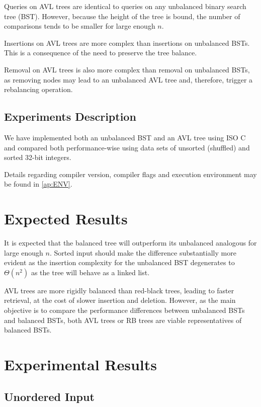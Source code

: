 \documentclass[12pt]{elsarticle}
\begin{document}
Queries on AVL trees are identical to queries on any unbalanced binary search
tree (BST). However, because the height of the tree is bound, the number of
comparisons tends to be smaller for large enough \(n\).

Insertions on AVL trees are more complex than insertions on unbalanced BSTs.
This is a consequence of the need to preserve the tree balance.

Removal on AVL trees is also more complex than removal on unbalanced BSTs, as
removing nodes may lead to an unbalanced AVL tree and, therefore, trigger a
rebalancing operation.

\subsection{Experiments Description}

We have implemented both an unbalanced BST and an AVL tree using ISO C and
compared both performance-wise using data sets of unsorted (shuffled) and sorted
32-bit integers.

Details regarding compiler version, compiler flags and execution environment
may be found in \ref{ap:ENV}.

\section{Expected Results}

It is expected that the balanced tree will outperform its unbalanced analogous
for large enough \(n\). Sorted input should make the difference substantially
more evident as the insertion complexity for the unbalanced BST degenerates to
\(\Theta\left(n^2\right)\) as the tree will behave as a linked list.

AVL trees are more rigidly balanced than red-black trees, leading to faster
retrieval, at the cost of slower insertion and deletion. However, as the main
objective is to compare the performance differences between unbalanced BSTs and
balanced BSTs, both AVL trees or RB trees are viable representatives of
balanced BSTs.

\section{Experimental Results}

\subsection{Unordered Input}
\end{document}
